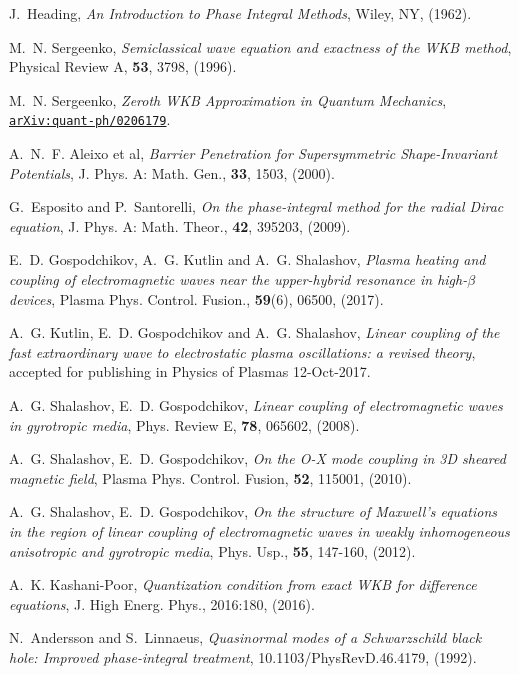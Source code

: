 \documentclass[atmp]{ipart_v1}
\begin{document}
\begin{thebibliography}{30}
 J.~Heading, 
\textit{An Introduction to Phase Integral Methods}, 
Wiley, NY, (1962).

 M.~N. Sergeenko,
\textit{Semiclassical wave equation and exactness of the WKB method},
Physical Review A, \textbf{53}, 3798, (1996).

 M.~N. Sergeenko, 
\textit{Zeroth WKB Approximation in Quantum Mechanics},
\href{https://arxiv.org/abs/quant-ph/0206179}{{\tt arXiv:quant-ph/0206179}}.

 A.~N.~F. Aleixo et al, 
\textit{Barrier Penetration for Supersymmetric Shape-Invariant Potentials},
J. Phys. A: Math. Gen., \textbf{33}, 1503, (2000).

 G.~Esposito and P.~Santorelli, 
\textit{On the phase-integral method for the radial Dirac equation},
J. Phys. A: Math. Theor., \textbf{42}, 395203, (2009).

 E.~D. Gospodchikov, A.~G. Kutlin and A.~G. Shalashov, 
\textit{Plasma heating and coupling of electromagnetic waves near the upper-hybrid resonance in high-$\beta$ devices},
Plasma Phys. Control. Fusion., \textbf{59}(6), 06500, (2017).

 A.~G. Kutlin, E.~D. Gospodchikov and A.~G. Shalashov, 
\textit{Linear coupling of the fast extraordinary wave to electrostatic plasma oscillations: a revised theory},
accepted for publishing in Physics of Plasmas 12-Oct-2017.

 A.~G. Shalashov,  E.~D. Gospodchikov,
\textit{Linear coupling of electromagnetic waves in gyrotropic media}, 
Phys. Review E, \textbf{78}, 065602, (2008).

 A.~G. Shalashov, E.~D. Gospodchikov, 
\textit{On the O-X mode coupling in 3D sheared magnetic field},
Plasma Phys. Control. Fusion, \textbf{52}, 115001, (2010). 

 A.~G. Shalashov, E.~D. Gospodchikov, 
\textit{On the structure of Maxwell's equations in the region of 
linear coupling of electromagnetic waves in weakly
inhomogeneous anisotropic and gyrotropic media},
Phys. Usp., \textbf{55}, 147-160, (2012).

 A.~K. Kashani-Poor, 
\textit{Quantization condition from exact WKB for difference equations},
J. High Energ. Phys., 2016:180, (2016).

 N.~Andersson and S.~Linnaeus, 
\textit{Quasinormal modes of a Schwarzschild black hole: Improved phase-integral treatment},
10.1103/PhysRevD.46.4179, (1992).


\end{thebibliography}
\end{document}
